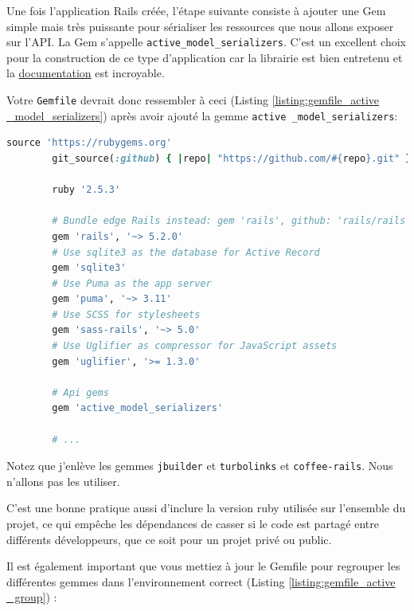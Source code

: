 \documentclass[]{report}
\begin{document}
        Une fois l'application Rails créée, l'étape suivante consiste à ajouter une Gem simple mais très puissante pour sérialiser les ressources que nous allons exposer sur l'API. La Gem s'appelle \verb|active_model_serializers|. C'est un excellent choix pour la construction de ce type d'application car la librairie est bien entretenu et la \href{https://github.com/rails-api/active_model_serializers}{documentation} est incroyable.

        Votre \verb|Gemfile| devrait donc ressembler à ceci (Listing \ref{listing:gemfile_active _model_serializers}) après avoir ajouté la gemme \verb|active _model_serializers|:


        \begin{scriptsize}
        \begin{lstlisting}[language=ruby, caption={Le Gemfile par défaut avec la Gem des sérialiseurs.}, label={listing:gemfile_active _model_serializers}, breaklines]
        source 'https://rubygems.org'
        git_source(:github) { |repo| "https://github.com/#{repo}.git" }

        ruby '2.5.3'

        # Bundle edge Rails instead: gem 'rails', github: 'rails/rails'
        gem 'rails', '~> 5.2.0'
        # Use sqlite3 as the database for Active Record
        gem 'sqlite3'
        # Use Puma as the app server
        gem 'puma', '~> 3.11'
        # Use SCSS for stylesheets
        gem 'sass-rails', '~> 5.0'
        # Use Uglifier as compressor for JavaScript assets
        gem 'uglifier', '>= 1.3.0'

        # Api gems
        gem 'active_model_serializers'

        # ...
        \end{lstlisting}
        \end{scriptsize}

        Notez que j'enlève les gemmes \verb|jbuilder| et \verb|turbolinks| et \verb|coffee-rails|. Nous n'allons pas les utiliser.

        C'est une bonne pratique aussi d'inclure la version ruby utilisée sur l'ensemble du projet, ce qui empêche les dépendances de casser si le code est partagé entre différents développeurs, que ce soit pour un projet privé ou public.

        Il est également important que vous mettiez à jour le Gemfile pour regrouper les différentes gemmes dans l'environnement correct (Listing \ref{listing:gemfile_active _group}) :
\end{document}
